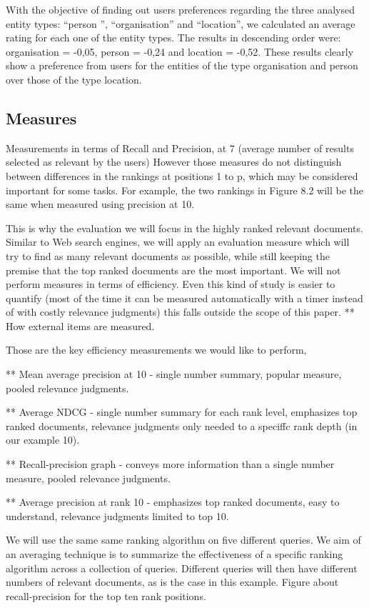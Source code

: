 \documentclass{llncs}
\begin{document}
With the objective of finding out users preferences regarding the three analysed entity types: ``person '', ``organisation'' and ``location'', we calculated an average rating for each one of the entity types. The results in descending order were: organisation = -0,05, person = -0,24  and location = -0,52. These results clearly show a preference from users for the entities of the type organisation and person over those of the type location.

\subsection{Measures}
Measurements in terms of Recall and Precision, at 7 (average number of results selected as relevant by the users)
However those measures do not distinguish between differences in the rankings at positions 1 to p, which may be considered important for some tasks. For example, the two rankings in Figure 8.2 will be the same when measured using precision at 10.

This is why  the evaluation we will focus in the highly ranked relevant documents. Similar to Web search engines, we will apply an evaluation measure which will try to find as many relevant documents as possible, while still keeping the  premise that the top ranked documents are the most important. We will not perform measures in terms of efficiency. Even this kind of study is easier to quantify (most of the time it can be measured automatically with a timer instead of with costly relevance judgments) this falls outside the scope of this paper.
** How external items are measured.

Those are the key efficiency measurements we would like to perform,

** Mean average precision at 10  - single number summary, popular measure, pooled
relevance judgments.

** Average NDCG - single number summary for each rank level, emphasizes top ranked documents, relevance judgments only needed to a speciffc rank depth
(in our example 10).

** Recall-precision graph - conveys more information than a single number measure, pooled relevance judgments.

** Average precision at rank 10 - emphasizes top ranked documents, easy to understand, relevance judgments limited to top 10.

We will use the same same ranking algorithm on five different queries. We aim of an averaging technique is to summarize the effectiveness of a specific ranking algorithm across a collection of queries. Different queries will then have different numbers of relevant documents, as is the case in this example. Figure about recall-precision for the top ten rank positions.
\end{document}
